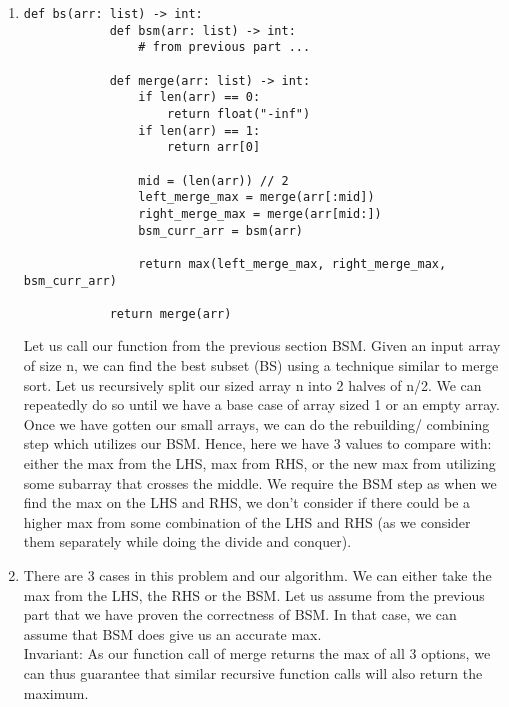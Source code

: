 \documentclass[12pt,letterpaper]{article}
\begin{document}
\begin{enumerate}
    \item 
    \begin{lstlisting}[style = Python]
        def bs(arr: list) -> int:
            def bsm(arr: list) -> int:
                # from previous part ...
            
            def merge(arr: list) -> int:
                if len(arr) == 0:
                    return float("-inf")
                if len(arr) == 1:
                    return arr[0]
                
                mid = (len(arr)) // 2
                left_merge_max = merge(arr[:mid])
                right_merge_max = merge(arr[mid:])
                bsm_curr_arr = bsm(arr)
                
                return max(left_merge_max, right_merge_max, bsm_curr_arr)
                
            return merge(arr)
    \end{lstlisting}
    
    Let us call our function from the previous section BSM. Given an input array of size n, 
    we can find the best subset (BS) using a technique similar to merge sort.
    Let us recursively split our sized array n into 2 halves of n/2.
    We can repeatedly do so until we have a base case of array sized 1 or an empty array.
    Once we have gotten our small arrays, we can do the rebuilding/ combining step which utilizes our BSM. 
    Hence, here we have 3 values to compare with: either the max from the LHS, max from RHS, 
    or the new max from utilizing some subarray that crosses the middle.
    We require the BSM step as when we find the max on the LHS and RHS, 
    we don't consider if there could be a higher max from some combination of the LHS and RHS
    (as we consider them separately while doing the divide and conquer).

    \item 
    There are 3 cases in this problem and our algorithm. 
    We can either take the max from the LHS, the RHS or the BSM.
    Let us assume from the previous part that we have proven the correctness of BSM. 
    In that case, we can assume that BSM does give us an accurate max. \\
    
    Invariant:
    As our function call of merge returns the max of all 3 options, we can thus guarantee that similar recursive function calls will also return the maximum. \\
    

\end{enumerate}
\end{document}
